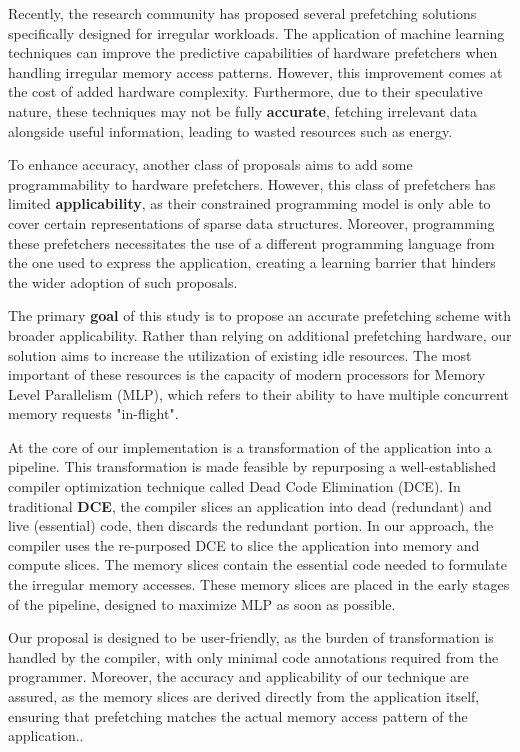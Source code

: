 \documentclass{acaces}
\begin{document}
Recently, the research community has proposed several prefetching solutions specifically designed for irregular workloads.
The application of machine learning techniques can improve the predictive capabilities of hardware prefetchers when handling irregular memory access patterns.
However, this improvement comes at the cost of added hardware complexity.
Furthermore, due to their speculative nature, these techniques may not be fully \textbf{accurate}, fetching irrelevant data alongside useful information,
leading to wasted resources such as energy.

To enhance accuracy, another class of proposals aims to add some programmability to hardware prefetchers.
However, this class of prefetchers has limited \textbf{applicability},
as their constrained programming model is only able to cover certain representations of sparse data structures.
Moreover, programming these prefetchers necessitates the use of a different programming language from the one used to express the application,
creating a learning barrier that hinders the wider adoption of such proposals.

The primary \textbf{goal} of this study is to propose an accurate prefetching scheme with broader applicability.
Rather than relying on additional prefetching hardware, our solution aims to increase the utilization of existing idle resources.
The most important of these resources is the capacity of modern processors for Memory Level Parallelism (MLP),
which refers to their ability to have multiple concurrent memory requests "in-flight".

At the core of our implementation is a transformation of the application into a pipeline.
This transformation is made feasible by repurposing a well-established compiler optimization technique called Dead Code Elimination (DCE).
In traditional \textbf{DCE}, the compiler slices an application into dead (redundant) and live (essential) code, then discards the redundant portion.
In our approach, the compiler uses the re-purposed DCE to slice the application into memory and compute slices.
The memory slices contain the essential code needed to formulate the irregular memory accesses.
These memory slices are placed in the early stages of the pipeline, designed to maximize MLP as soon as possible.

Our proposal is designed to be user-friendly, as the burden of transformation is handled by the compiler, with only minimal code annotations required from the programmer.
Moreover, the accuracy and applicability of our technique are assured, as the memory slices are derived directly from the application itself,
ensuring that prefetching matches the actual memory access pattern of the application..
\end{document}
